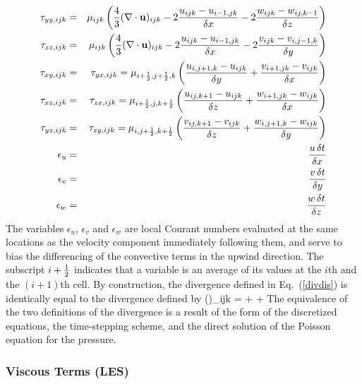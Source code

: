 \documentclass[11pt]{book}
\begin{document}
\begin{eqnarray}
\tau_{yy,ijk} &=& \mu_{ijk} \left( \frac{4}{3} (\nabla \cdot {\bf u})_{ijk} - 2 \frac{u_{ijk}-u_{i-1,jk}}{\delta x}  - 2 \frac{w_{ijk}-w_{ij,k-1}}{\delta z} \right)  \\
\tau_{zz,ijk} &=& \mu_{ijk} \left( \frac{4}{3} (\nabla \cdot {\bf u})_{ijk} - 2 \frac{u_{ijk}-u_{i-1,jk}}{\delta x}  - 2 \frac{v_{ijk}-v_{i,j-1,k}}{\delta y} \right)  \\
\tau_{xy,ijk} &=& \tau_{yx,ijk}
        = \mu_{i+\frac{1}{2},j+\frac{1}{2},k} \left( \frac{u_{i,j+1,k}-u_{ijk}}{\delta y}
                         + \frac{v_{i+1,jk} -v_{ijk}}{\delta x} \right) \\
\tau_{xz,ijk} &=& \tau_{zx,ijk}
        =\mu_{i+\frac{1}{2},j,k+\frac{1}{2}} \left( \frac{u_{ij,k+1}-u_{ijk}}{\delta z}
                        + \frac{w_{i+1,jk}-w_{ijk}}{\delta x} \right) \\
\tau_{yz,ijk} &=& \tau_{zy,ijk}
        =\mu_{i,j+\frac{1}{2},k+\frac{1}{2}} \left( \frac{v_{ij,k+1}-v_{ijk}}{\delta z}
                        + \frac{w_{i,j+1,k}-w_{ijk}}{\delta y} \right) \\
\epsilon_u &=& \frac{u \, \delta t}{\delta x} \\
\epsilon_v &=& \frac{v \, \delta t}{\delta y} \\
\epsilon_w &=& \frac{w \, \delta t}{\delta z}
\end{eqnarray}
The variables $\epsilon_u$, $\epsilon_v$ and $\epsilon_w$ are local
Courant numbers evaluated at the same locations as the velocity component
immediately following them, and serve to bias the differencing of
the convective terms in the upwind direction.
The subscript $i+\frac{1}{2}$ indicates that a variable is an average of its
values at the $i$th and the $(i+1)$th cell.
By construction, the divergence defined in Eq.~(\ref{divdis})
is identically equal to the divergence defined by
\be (\nabla \cdot \bu)_{ijk} =  +
                                +
                                  \ee
The equivalence of the two definitions of the divergence is a result
of the form of the discretized equations, the time-stepping scheme, and
the direct solution of the Poisson equation for the pressure.


\subsubsection{Viscous Terms (LES)}
\end{document}
